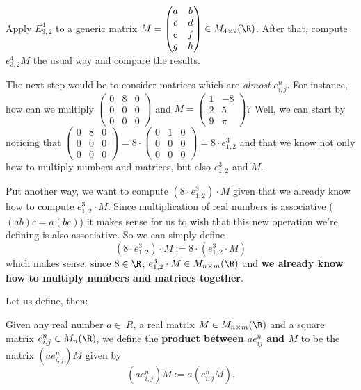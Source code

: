 \begin{exerc}
	Apply $E^4_{3,2}$ to a generic matrix $M=\begin{pmatrix}
	a & b\\
	c & d\\
	e & f\\
	g & h
	\end{pmatrix}\in M_{4\times 2}(\R)$. After that, compute $e^4_{3,2}M$ the usual way and compare the results.
\end{exerc}


\bigskip
The next step would be to consider matrices which are \textit{almost} $e^n_{i,j}$. For instance, how can we multiply $\begin{pmatrix}
0 & 8 & 0\\
0 & 0 & 0\\
0&0&0
\end{pmatrix}$ and $M=\begin{pmatrix}
1 & -8\\
2 & 5\\
9 & \pi
\end{pmatrix}$? Well, we can start by noticing that $\begin{pmatrix}
0 & 8 & 0\\
0 & 0 & 0\\
0&0&0
\end{pmatrix}=8\cdot\begin{pmatrix}
0 & 1 & 0\\
0 & 0 & 0\\
0&0&0
\end{pmatrix}=8\cdot e^3_{1,2}$ and that we know not only how to multiply numbers and matrices, but also $e^3_{1,2}$ and $M$.

Put another way, we want to compute $(8\cdot e^3_{1,2})\cdot M$ given that we already know how to compute $e^3_{1,2}\cdot M$. Since multiplication of real numbers is associative ($(ab)c=a(bc)$) it makes sense for us to wish that this new operation we're defining is also associative. So we can simply define
\[(8\cdot e^3_{1,2})\cdot M:=8\cdot(e^3_{1,2}\cdot M)\]which makes sense, since $8\in \R$, $e^3_{1,2}\cdot M\in M_{n\times m}(\R)$ and \textbf{we already know how to multiply numbers and matrices together}.

Let us define, then:

\begin{df}
	Given any real number $a\in\ R$, a real matrix $M\in M_{n\times m}(\R)$ and a square matrix $e^n_{i,j}\in M_n(\R)$, we define the \textbf{product between $ae^n_{ij}$ and $M$} to be the matrix $(ae^n_{i,j})M$ given by
	\[(ae^n_{i,j})M:=a(e^n_{i,j}M).\]
\end{df}


